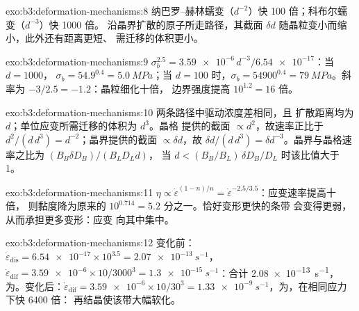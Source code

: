 \begin{solution}{exo:b3:deformation-mechanisms:8}
纳巴罗–赫林蠕变（$d^{-2}$）快 100 倍；科布尔蠕变（$d^{-3}$）快 1000 倍。
沿晶界扩散的原子所走路径，其截面 $\delta
d$ 随晶粒变小而缩小，此外还有距离更短、
需迁移的体积更小。
\end{solution}

\begin{solution}{exo:b3:deformation-mechanisms:9}
$\sigma_b^{2.5} = \num{3.59e-6}\,d^{-3}/\num{6.54e-17}$：当 $d = 1000$，
$\sigma_b = 54.9^{0.4} = \qty{5.0}{MPa}$；当 $d = 100$ 时，$\sigma_b =
\num{54900}^{0.4} = \qty{79}{MPa}$。斜率为 $-3/2.5 = -1.2$：晶粒细化十倍，
边界强度提高 $10^{1.2} = 16$ 倍。
\end{solution}

\begin{solution}{exo:b3:deformation-mechanisms:10}
两条路径中驱动浓度差相同，且
扩散距离均为 $d$；单位应变所需迁移的体积为 $d^3$。晶格
提供的截面 $\propto d^2$，故速率正比于 $d^2/(d\,d^3) =
d^{-2}$；晶界提供的截面 $\propto\delta d$，故 $\delta d/(d\,d^3) = \delta
d^{-3}$。晶界与晶格速率之比为 $(B_B\delta D_B)/(B_LD_Ld)$，
当 $d < (B_B/B_L)\,\delta D_B/D_L$ 时该比值大于 1。
\end{solution}

\begin{solution}{exo:b3:deformation-mechanisms:11}
$\eta \propto \dot\varepsilon^{(1-n)/n} = \dot\varepsilon^{-2.5/3.5}$：应变速率提高十倍，
则黏度降为原来的 $10^{0.714} = 5.2$ 分之一。恰好变形更快的条带
会变得更弱，从而承担更多变形：应变
向其中集中。
\end{solution}

\begin{solution}{exo:b3:deformation-mechanisms:12}
变化前：$\dot\varepsilon_{\mathrm{dis}} = \num{6.54e-17}\times10^{3.5} =
\qty{2.07e-13}{s^{-1}}$，$\dot\varepsilon_{\mathrm{dif}} = \num{3.59e-6}
\times10/3000^3 = \qty{1.3e-15}{s^{-1}}$：合计 \qty{2.08e-13}{s^{-1}}，
为。变化后：$\dot\varepsilon_{\mathrm{dif}} = \num{3.59e-6}\times10/30^3 =
\qty{1.33e-9}{s^{-1}}$，为，在相同应力下快 \num{6400} 倍：
再结晶使该带大幅软化。
\end{solution}

